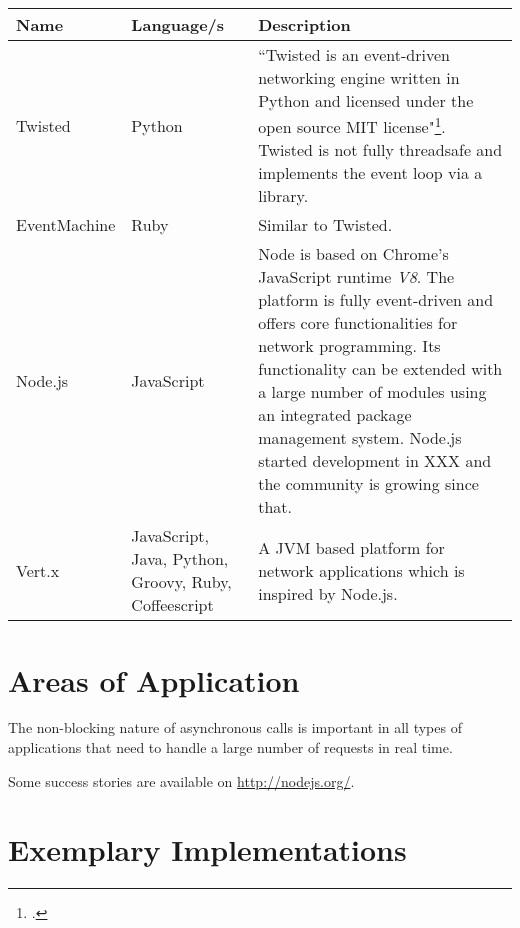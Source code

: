 \begin{savenotes} %
\begin{table}[h]
\centering
\begin{tabular*}{\textwidth}{p{} p{} p{}}
\toprule
\textbf{Name} & \textbf{Language/s} & \textbf{Description} \\
\midrule 
Twisted			& Python			& ``Twisted is an event-driven networking engine written in 
									  Python and licensed under the open source MIT license"\footcite[Cf.][]{Twisted_2012}.
									  Twisted is not fully threadsafe and implements the event
									  loop via a library.\\
									  
EventMachine	& Ruby				& Similar to Twisted.\\

Node.js			& JavaScript		& Node is based on Chrome's JavaScript runtime \textit{V8}.
									  The platform is fully event-driven and offers core
									  functionalities for network programming. Its functionality
									  can be extended with a large number of modules using an
									  integrated package management system.
									  Node.js started development in XXX and the community
									  is growing since that.\\
									  
Vert.x			& JavaScript, Java, Python, Groovy, Ruby, Coffeescript		
									& A JVM based platform for network applications which is
									  inspired by Node.js.\\
\bottomrule 
\end{tabular*}
  \label{tab:existing_frameworks}
\end{table}
\end{savenotes}


\section{Areas of Application}
\label{areas_of_application}

The non-blocking nature of asynchronous calls is important in all types of
applications that need to handle a large number of requests in real time.

Some success stories are available on \url{http://nodejs.org/}.


\section{Exemplary Implementations}
\label{exemplary_implementations}

